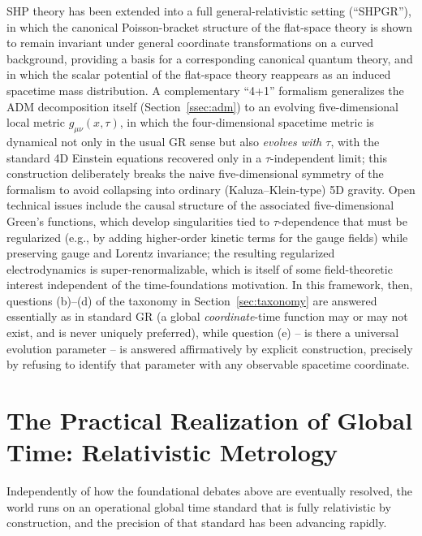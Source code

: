 \documentclass[11pt]{article}
\begin{document}
SHP theory has been extended into a full general-relativistic setting (``SHPGR''), in which the canonical Poisson-bracket structure of the flat-space theory is shown to remain invariant under general coordinate transformations on a curved background, providing a basis for a corresponding canonical quantum theory, and in which the scalar potential of the flat-space theory reappears as an induced spacetime mass distribution. A complementary ``4+1'' formalism generalizes the ADM decomposition itself (Section~\ref{ssec:adm}) to an evolving five-dimensional local metric $g_{\mu\nu}(x,\tau)$, in which the four-dimensional spacetime metric is dynamical not only in the usual GR sense but also \emph{evolves with $\tau$}, with the standard 4D Einstein equations recovered only in a $\tau$-independent limit; this construction deliberately breaks the naive five-dimensional symmetry of the formalism to avoid collapsing into ordinary (Kaluza--Klein-type) 5D gravity. Open technical issues include the causal structure of the associated five-dimensional Green's functions, which develop singularities tied to $\tau$-dependence that must be regularized (e.g., by adding higher-order kinetic terms for the gauge fields) while preserving gauge and Lorentz invariance; the resulting regularized electrodynamics is super-renormalizable, which is itself of some field-theoretic interest independent of the time-foundations motivation. In this framework, then, questions (b)--(d) of the taxonomy in Section~\ref{sec:taxonomy} are answered essentially as in standard GR (a global \emph{coordinate}-time function may or may not exist, and is never uniquely preferred), while question (e) -- is there a universal evolution parameter -- is answered affirmatively by explicit construction, precisely by refusing to identify that parameter with any observable spacetime coordinate.

\section{The Practical Realization of Global Time: Relativistic Metrology}
\label{sec:metrology}

Independently of how the foundational debates above are eventually resolved, the world runs on an operational global time standard that is fully relativistic by construction, and the precision of that standard has been advancing rapidly.
\end{document}
